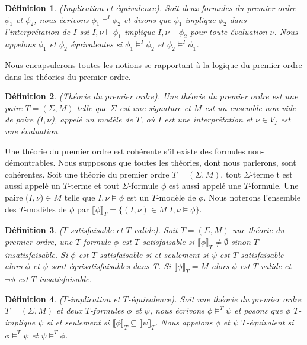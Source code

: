 \documentclass[11pt,openany]{article}
\newcommand\phibra{\llbracket\phi\rrbracket}
\newcommand\psibra{\llbracket\psi\rrbracket}
\newtheorem{definition}{D\'efinition}[subsection]
\begin{document}
\begin{definition}
(Implication et \'equivalence). Soit deux formules du premier ordre $\phi_{1}$ et $\phi_{2}$, nous \'ecrivons $\phi_{1}\models^{I}\phi_{2}$ et disons que $\phi_{1}$ implique $\phi_{2}$ dans l'interpr\'etation de $I$ ssi $I,\nu\models\phi_{1}$ implique $I,\nu\models\phi_{2}$ pour toute \'evaluation $\nu$. Nous appelons $\phi_{1}$  et $\phi_{2}$  \'equivalentes si $\phi_{1}\models^{I}\phi_{2}$ et $\phi_{2}\models^{I}\phi_{1}$.
\end{definition}

	Nous encapsulerons toutes les notions se rapportant \`a la logique du premier ordre dans les th\'eories du premier ordre.

\begin{definition}
(Th\'eorie du premier ordre). Une th\'eorie du premier ordre est une paire $T=( \Sigma,M)$ telle que $ \Sigma$ est une signature et $M$ est un ensemble non vide de paire ($I,\nu$), appel\'e un mod\`ele de $T$, o\`u $I$ est une interpr\'etation et $\nu\in V_{I}$ est une \'evaluation.
\end{definition}

Une th\'eorie du premier ordre est coh\'erente s'il existe des formules non-d\'emontrables. Nous supposons que toutes les th\'eories, dont nous parlerons, sont coh\'erentes. Soit une th\'eorie du premier ordre $T = ( \Sigma,M)$, tout $ \Sigma$-terme t est aussi appel\'e un $T$-terme et tout $ \Sigma$-formule $\phi$ est aussi appel\'e une $T$-formule. Une paire ($I,\nu$)$\in M$ telle que $I,\nu\models\phi$ est un $T$-mod\`ele de $\phi$. Nous noterons l'ensemble des $T$-mod\`eles de $\phi$ par $\phibra_{T} = \{(I,\nu)\in M | I,\nu\models\phi\}$.

\begin{definition}
($T$-satisfaisable et $T$-valide). Soit $T = (\Sigma,M)$ une th\'eorie du premier ordre, une $T$-formule $\phi$ est $T$-satisfaisable si $\phibra_{T} \neq \emptyset$ sinon $T$-insatisfaisable. Si $\phi$ est $T$-satisfaisable si et seulement si $\psi$ est $T$-satisfaisable alors $\phi$ et $\psi$ sont \'equisatisfaisables dans T. Si $\phibra_{T} = M$ alors $\phi$ est $T$-valide et $\neg\phi$ est $T$-insatisfaisable.
\end{definition}

\begin{definition}
($T$-implication et $T$-\'equivalence). Soit une th\'eorie du premier ordre $T = ( \Sigma,M)$ et deux $T$-formules $\phi$ et $\psi$, nous \'ecrivons $\phi\models^{T}\psi$ et posons que $\phi$ $T$-implique $\psi$ si et seulement si $\phibra_{T}\subseteq \psibra_{T}$. Nous appelons $\phi$  et $\psi$  $T$-\'equivalent si $\phi\models^{T}\psi$ et $\psi\models^{T}\phi$.
\end{definition}
\end{document}
